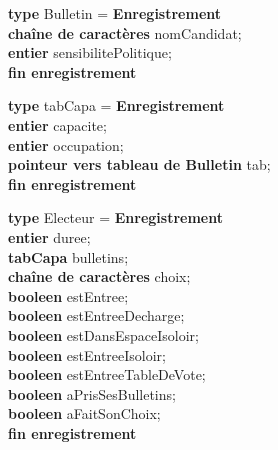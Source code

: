 \documentclass[12pt]{article} %
\begin{document}
\begin{flushleft}
	\begin{minipage}[t]{0.5\textwidth}
		\textbf{type} Bulletin = \textbf{Enregistrement}\\
		\hspace*{1em} \textbf{chaîne de caractères} nomCandidat;\\
		\hspace*{1em} \textbf{entier} sensibilitePolitique;\\
		\textbf{fin enregistrement}
	\end{minipage}%
	\hfill
	\begin{minipage}[t]{0.5\textwidth}
		\textbf{type} tabCapa = \textbf{Enregistrement}\\
		\hspace*{1em} \textbf{entier} capacite;\\
		\hspace*{1em} \textbf{entier} occupation;\\
		\hspace*{1em} \textbf{pointeur vers tableau de Bulletin} tab;\\ 
		\textbf{fin enregistrement}
	\end{minipage}
\end{flushleft}

\begin{flushleft}
	\textbf{type} Electeur = \textbf{Enregistrement}\\
	\hspace*{1em} \textbf{entier} duree;\\
	\hspace*{1em} \textbf{tabCapa} bulletins;\\
	\hspace*{1em} \textbf{chaîne de caractères} choix;\\
	\hspace*{1em} \textbf{booleen} estEntree;\\
	\hspace*{1em}  \textbf{booleen} estEntreeDecharge;\\
	\hspace*{1em}  \textbf{booleen} estDansEspaceIsoloir;\\
	\hspace*{1em}  \textbf{booleen} estEntreeIsoloir;\\
	\hspace*{1em}  \textbf{booleen} estEntreeTableDeVote;\\
	\hspace*{1em}  \textbf{booleen} aPrisSesBulletins;\\
	\hspace*{1em}  \textbf{booleen} aFaitSonChoix;\\
	\textbf{fin enregistrement}
\end{flushleft}
\end{document}
